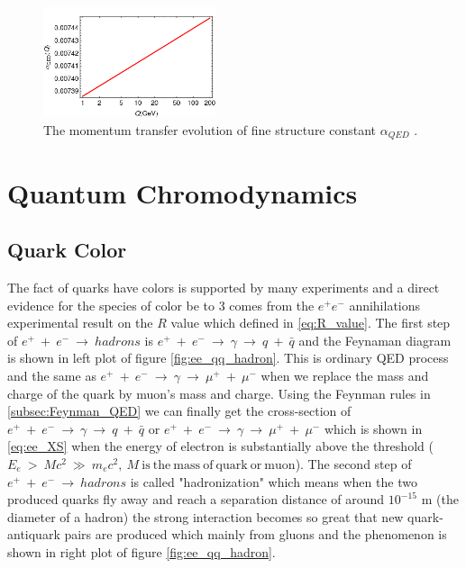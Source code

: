 \begin{figure}[h!]
 \begin{center}
\includegraphics[width=0.45\textwidth]{figures/theory/alphaQED.png}
\caption{The momentum transfer evolution of fine structure constant $\alpha_{QED}$ \cite{Roberts:2012sv}.}
  \label{fig:running_QED}
 \end{center}
\end{figure}


\clearpage
\section{Quantum Chromodynamics}\label{subsec:QCD}
\subsection{Quark Color}\label{subsec:quark_color}
The fact of quarks have colors is supported by many experiments and a direct evidence for the species of color be to 3 comes from the $e^{+}e^{-}$ annihilations experimental result on the $R$ value which defined in \ref{eq:R_value}. The first step of $e^{+}~+~e^{-}~\rightarrow~hadrons$ is $e^{+}~+~e^{-}~\rightarrow~\gamma~\rightarrow~q~+~\bar{q}$ and the Feynaman diagram is shown in left plot of figure \ref{fig:ee_qq_hadron}. This is ordinary QED process and the same as $e^{+}~+~e^{-}~\rightarrow~\gamma~\rightarrow~\mu^{+}~+~\mu^{-}$ when we replace the mass and charge of the quark by muon's mass and charge. Using the Feynman rules in \ref{subsec:Feynman_QED} we can finally get the cross-section of $e^{+}~+~e^{-}~\rightarrow~\gamma~\rightarrow~q~+~\bar{q}$ or $e^{+}~+~e^{-}~\rightarrow~\gamma~\rightarrow~\mu^{+}~+~\mu^{-}$ which is shown in \ref{eq:ee_XS} when the energy of electron is substantially above the threshold ($E_{e}~>~Mc^{2}~\gg~m_{e}c^{2},~M~\mathrm{is~the~mass~of~quark~or~muon}$). The second step of $e^{+}~+~e^{-}~\rightarrow~hadrons$ is called "hadronization" which means when the two produced quarks fly away and reach a separation distance of around $10^{-15}$ m (the diameter of a hadron) the strong interaction becomes so great that new quark-antiquark pairs are produced which mainly from gluons and the phenomenon is shown in right plot of figure \ref{fig:ee_qq_hadron}.

